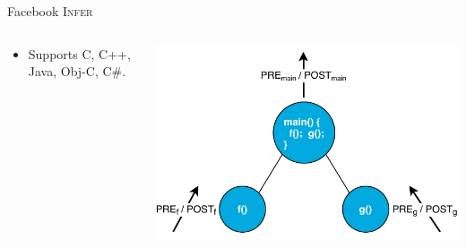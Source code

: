 \documentclass[10pt, xcolor=pdflatex, hyperref={unicode}, aspectratio=169]{beamer}
\begin{document}
\begin{frame}{Facebook \textsc{Infer}}
\begin{columns}
\begin{column}{.55 \linewidth}
\begin{itemize}
                \item Supports C, C++, Java, Obj-C, C\#.
            \end{itemize}
        \end{column}

        \begin{column}{.45 \linewidth}
            \centering
            \includegraphics[width=1 \linewidth]{infer.pdf}
        \end{column}
    \end{columns}
\end{frame}


\end{document}
